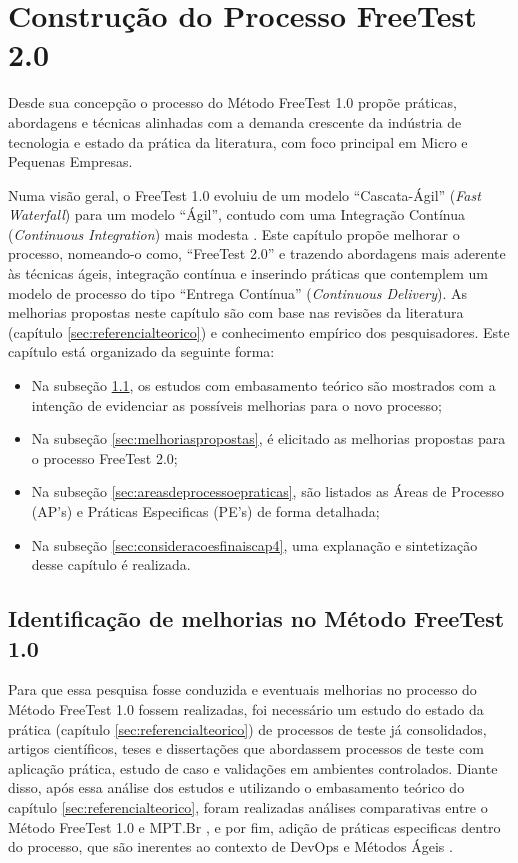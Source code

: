 \chapter{Construção do Processo FreeTest 2.0}
\label{sec:construcaoframeworkprocesso}

Desde sua concepção o processo do Método FreeTest 1.0 propõe práticas, abordagens e técnicas alinhadas com a demanda crescente da indústria de tecnologia e estado da prática da literatura, com foco principal em Micro e Pequenas Empresas. 

Numa visão geral, o FreeTest 1.0 evoluiu de um modelo “Cascata-Ágil” (\textit{Fast Waterfall}) para um modelo “Ágil”, contudo com uma Integração Contínua (\textit{Continuous Integration}) mais modesta \cite{sauceLabes2017}. Este capítulo propõe melhorar o processo, nomeando-o como, “FreeTest 2.0” e trazendo abordagens mais aderente às técnicas ágeis, integração contínua e inserindo práticas que contemplem um modelo de processo do tipo “Entrega Contínua” (\textit{Continuous Delivery}). As melhorias propostas neste capítulo são com base nas revisões da literatura (capítulo \ref{sec:referencialteorico}) e conhecimento empírico dos pesquisadores. Este capítulo está organizado da seguinte forma:

\begin{itemize}
    \item Na subseção \ref{sec:identificacaomelhoriasfreetest}, os estudos com embasamento teórico são mostrados com a intenção de evidenciar as possíveis melhorias para o novo processo;
    \item Na subseção \ref{sec:melhoriaspropostas}, é elicitado as melhorias propostas para o processo FreeTest 2.0;
    \item Na subseção \ref{sec:areasdeprocessoepraticas}, são listados as Áreas de Processo (AP's) e Práticas Especificas (PE's) de forma detalhada;
    \item Na subseção \ref{sec:consideracoesfinaiscap4}, uma explanação e sintetização desse capítulo é realizada.
\end{itemize}

\section{Identificação de melhorias no Método FreeTest 1.0}
\label{sec:identificacaomelhoriasfreetest}

Para que essa pesquisa fosse conduzida e eventuais melhorias no processo do Método FreeTest 1.0 fossem realizadas, foi necessário um estudo do estado da prática (capítulo \ref{sec:referencialteorico}) de processos de teste já consolidados, artigos científicos, teses e dissertações que abordassem processos de teste com aplicação prática, estudo de caso e validações em ambientes controlados. Diante disso, após essa análise dos estudos e utilizando o embasamento teórico do capítulo \ref{sec:referencialteorico}, foram realizadas análises comparativas entre o Método FreeTest 1.0 e MPT.Br \cite{GuiaMPTbr}, e por fim, adição de práticas especificas dentro do processo, que são inerentes ao contexto de DevOps \cite{Debois2008} e Métodos Ágeis \cite{Beck2001}. 

